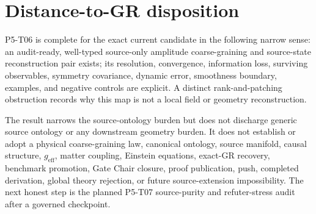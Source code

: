 \documentclass[11pt]{article}
\begin{document}
\section{Distance-to-GR disposition}

P5-T06 is complete for the exact current candidate in the following narrow
sense: an audit-ready, well-typed source-only amplitude coarse-graining and
source-state reconstruction pair exists; its resolution, convergence,
information loss, surviving observables, symmetry covariance, dynamic error,
smoothness boundary, examples, and negative controls are explicit.  A
distinct rank-and-patching obstruction records why this map is not a local
field or geometry reconstruction.

The result narrows the source-ontology burden but does not discharge generic
source ontology or any downstream geometry burden.  It does not establish or
adopt a physical coarse-graining law, canonical ontology, source manifold,
causal structure, \(g_{\mathrm{eff}}\), matter coupling, Einstein equations,
exact-GR recovery, benchmark promotion, Gate Chair closure, proof
publication, push, completed derivation, global theory rejection, or future
source-extension impossibility.  The next honest step is the planned P5-T07
source-purity and refuter-stress audit after a governed checkpoint.
\end{document}
